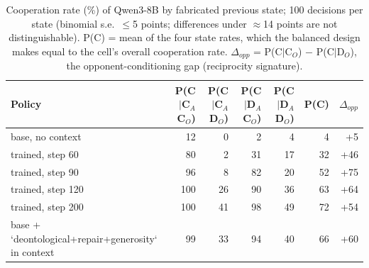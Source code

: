 \begin{table}[t]
\centering
\caption{Cooperation rate (\%) of Qwen3-8B by fabricated previous state; 100 decisions per state (binomial s.e.\ $\leq$5 points; differences under $\approx$14 points are not distinguishable). P(C) = mean of the four state rates, which the balanced design makes equal to the cell's overall cooperation rate. $\Delta_{opp}$ = P(C$\mid$C$_O$) $-$ P(C$\mid$D$_O$), the opponent-conditioning gap (reciprocity signature).}
\label{tab:post-training-qwen_run2_200}
\small
\setlength{\tabcolsep}{3.5pt}
\begin{tabular}{lrrrrrr}
\toprule
Policy & P(C$\mid$C$_A$C$_O$) & P(C$\mid$C$_A$D$_O$) & P(C$\mid$D$_A$C$_O$) & P(C$\mid$D$_A$D$_O$) & P(C) & $\Delta_{opp}$ \\
\midrule
base, no context & 12 & 0 & 2 & 4 & 4 & +5 \\
trained, step 60 & 80 & 2 & 31 & 17 & 32 & +46 \\
trained, step 90 & 96 & 8 & 82 & 20 & 52 & +75 \\
trained, step 120 & 100 & 26 & 90 & 36 & 63 & +64 \\
trained, step 200 & 100 & 41 & 98 & 49 & 72 & +54 \\
base + `deontological+repair+generosity` in context & 99 & 33 & 94 & 40 & 66 & +60 \\
\bottomrule
\end{tabular}
\end{table}
